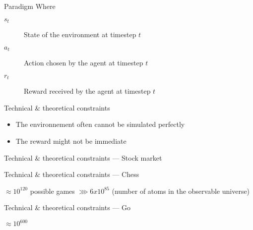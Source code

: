 \begin{frame}{Paradigm}
  Where

  \begin{description}
    \item[$s_t$] State of the environment at timestep $t$
    \item[$a_t$] Action chosen by the agent at timestep $t$
    \item[$r_t$] Reward received by the agent at timestep $t$
  \end{description}
\end{frame}

\begin{frame}{Technical \& theoretical constraints}
  \begin{itemize}[<+->]
    \item The environnement often cannot be simulated perfectly 
    \item The reward might not be immediate
  \end{itemize}
\end{frame}

\begin{frame}{Technical \& theoretical constraints --- Stock market}
\end{frame}

\begin{frame}{Technical \& theoretical constraints --- Chess}
  \pause
  \begin{center}
    $\approx 10^{120}$ possible games $\ggg 6 x 10^{85}$
    \newline
    (number of atoms in the observable universe)
  \end{center}
\end{frame}

\begin{frame}{Technical \& theoretical constraints --- Go}
  \begin{center}
    \huge{$\approx 10^{600}$}
  \end{center}
\end{frame}
